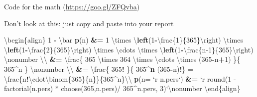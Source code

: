 \documentclass[ignorenonframetext,]{beamer}
\newenvironment{Shaded}{\begin{snugshade}}{\end{snugshade}}
\newcommand{\DataTypeTok}[1]{\textcolor[rgb]{0.13,0.29,0.53}{#1}}
\newcommand{\DecValTok}[1]{\textcolor[rgb]{0.00,0.00,0.81}{#1}}
\newcommand{\ErrorTok}[1]{\textcolor[rgb]{0.64,0.00,0.00}{\textbf{#1}}}
\newcommand{\KeywordTok}[1]{\textcolor[rgb]{0.13,0.29,0.53}{\textbf{#1}}}
\newcommand{\NormalTok}[1]{#1}
\newcommand{\OperatorTok}[1]{\textcolor[rgb]{0.81,0.36,0.00}{\textbf{#1}}}
\newcommand{\StringTok}[1]{\textcolor[rgb]{0.31,0.60,0.02}{#1}}
\begin{document}
\begin{frame}[fragile]{Code for the math (\url{https://goo.gl/ZFQvba})}
\protect\hypertarget{code-for-the-math-httpsgoo.glzfqvba}{}

Don't look at this: just copy and paste into your report

\begin{Shaded}
\begin{Highlighting}[]
\NormalTok{\textbackslash{}begin\{align\} }
 \DecValTok{1} \OperatorTok{-}\StringTok{ }\NormalTok{\textbackslash{}bar }\KeywordTok{p}\NormalTok{(n) }\OperatorTok{&}\ErrorTok{=}\StringTok{ }\DecValTok{1}\NormalTok{ \textbackslash{}times \textbackslash{}}\KeywordTok{left}\NormalTok{(}\DecValTok{1}\OperatorTok{-}\NormalTok{\textbackslash{}frac\{}\DecValTok{1}\NormalTok{\}\{}\DecValTok{365}\NormalTok{\}\textbackslash{}right) }
\NormalTok{ \textbackslash{}times \textbackslash{}}\KeywordTok{left}\NormalTok{(}\DecValTok{1}\OperatorTok{-}\NormalTok{\textbackslash{}frac\{}\DecValTok{2}\NormalTok{\}\{}\DecValTok{365}\NormalTok{\}\textbackslash{}right) \textbackslash{}times \textbackslash{}cdots \textbackslash{}times }
\NormalTok{ \textbackslash{}}\KeywordTok{left}\NormalTok{(}\DecValTok{1}\OperatorTok{-}\NormalTok{\textbackslash{}frac\{n}\DecValTok{-1}\NormalTok{\}\{}\DecValTok{365}\NormalTok{\}\textbackslash{}right) \textbackslash{}nonumber  \textbackslash{}\textbackslash{}  }
 \OperatorTok{&}\ErrorTok{=}\StringTok{ }\NormalTok{\textbackslash{}frac\{ }\DecValTok{365}\NormalTok{ \textbackslash{}times }\DecValTok{364}\NormalTok{ \textbackslash{}times \textbackslash{}cdots \textbackslash{}times }
\NormalTok{   (}\DecValTok{365}\OperatorTok{-}\NormalTok{n}\OperatorTok{+}\DecValTok{1}\NormalTok{) \}\{ }\DecValTok{365}\OperatorTok{^}\NormalTok{n \} \textbackslash{}nonumber \textbackslash{}\textbackslash{} }
 \OperatorTok{&}\ErrorTok{=}\StringTok{ }\NormalTok{\textbackslash{}frac\{ }\DecValTok{365}\OperatorTok{!}\StringTok{ }\NormalTok{\}\{ }\DecValTok{365}\OperatorTok{^}\KeywordTok{n}\NormalTok{ (}\DecValTok{365}\OperatorTok{-}\NormalTok{n)}\OperatorTok{!}\NormalTok{\} =}\StringTok{ }
\StringTok{   }\NormalTok{\textbackslash{}frac\{n}\OperatorTok{!}\NormalTok{\textbackslash{}cdot\textbackslash{}binom\{}\DecValTok{365}\NormalTok{\}\{n\}\}\{}\DecValTok{365}\OperatorTok{^}\NormalTok{n\}\textbackslash{}\textbackslash{}}
\KeywordTok{p}\NormalTok{(}\DataTypeTok{n=} \StringTok{`}\DataTypeTok{r n.pers}\StringTok{`}\NormalTok{) }\OperatorTok{&}\ErrorTok{=}\StringTok{ `}\DataTypeTok{r  }
\DataTypeTok{ round(1 - factorial(n.pers) * }
\DataTypeTok{         choose(365,n.pers)/ 365^n.pers, 3)}\StringTok{`}\NormalTok{\textbackslash{}nonumber}
\NormalTok{\textbackslash{}end\{align\}}
\end{Highlighting}
\end{Shaded}

\end{frame}
\end{document}

